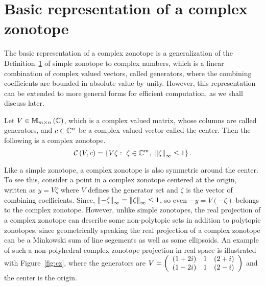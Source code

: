 \section{Basic representation of a complex zonotope}
The basic representation of a complex zonotope is a generalization of
the Definition~\ref{} of simple zonotope to complex numbers, which is
a linear combination of complex valued vectors, called generators,
where the combining coefficients are bounded in absolute value by
unity.  However, this representation can be extended to more general
forms for efficient computation, as we shall discuss later.
%
\begin{definition}
Let $V\in\mathbb{M}_{m\times n}\left(\mathbb{C}\right)$, which is a complex valued matrix,
whose columns are called generators, and $c\in\mathbb{C}^n$ be a
complex valued vector called the center.  Then the following is a
complex zonotope.
%
\begin{equation}
\mathit{\mathcal{C}}\left(V,c\right) = \left\{V\zeta:~\zeta\in\mathbb{C}^m,~\left\|\zeta\right\|_{\infty}\leq 1\right\}.
\end{equation}
%
\end{definition}
%
Like a simple zonotope, a complex zonotope is also symmetric around
the center.  To see this, consider a point in a complex zonotope
centered at the origin, written as $y=V\zeta$ where $V$ defines the
generator set and $\zeta$ is the vector of combining coefficients.
Since, $\left\|-\zeta\right\|_{\infty}=\left\|\zeta\right\|_{\infty}\leq 1$, so even
$-y=V(-\zeta)$ belongs to the complex zonotope.  However, unlike
simple zonotopes, the real projection of a complex zonotope can
describe some non-polytopic sets in addition to polytopic zonotopes,
since geometrically speaking the real projection of a complex zonotope
can be a Minkowski sum of line segements as well as some ellipsoids.
An example of such a non-polyhedral complex zonotope projection in
real space is illustrated with Figure~\ref{fig:cz}, where the
generators are $V=\left(\begin{array}{lll}(1+2i) & 1 & (2+i)\\(1-2i) & 1
& (2-i)\end{array}\right)$ and the center is the origin.

